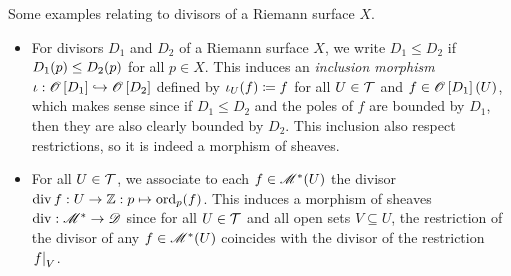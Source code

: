\documentclass[../Moduli_Spaces_of_Riemann_Surfaces.tex]{subfiles}
\begin{document}
    \begin{example}
        Some examples relating to divisors of a Riemann surface $X$.
        \begin{itemize}
            \item For divisors $D_1$ and $D_2$ of a Riemann surface $X$, we write $D_1\leq D_2$ if $D_1\!\left(p\right)\leq D_2\!\left(p\right)$ for all $p\in X$. This induces an \textit{inclusion morphism} $\iota:\mathscr{O}\left[D_1\right]\hookrightarrow\mathscr{O}\left[D_2\right]$ defined by $\iota_U\!\left(f\right)\coloneqq f$ for all $U\in\mathcal{T}$ and $f\in\mathscr{O}\left[D_1\right]\left(U\right)$, which makes sense since if $D_1\leq D_2$ and the poles of $f$ are bounded by $D_1$, then they are also clearly bounded by $D_2$. This inclusion also respect restrictions, so it is indeed a morphism of sheaves.
            \item For all $U\in\mathcal{T}$, we associate to each $f\in\mathscr{M}^\ast\!\left(U\right)$ the divisor $\operatorname{div} f:U\to\mathbb{Z}:p\mapsto\operatorname{ord}_p\!\left(f\right)$. This induces a morphism of sheaves $\operatorname{div}:\mathscr{M}^\ast\to\mathscr{D}$ since for all $U\in\mathcal{T}$ and all open sets $V\subseteq U$, the restriction of the divisor of any $f\in\mathscr{M}^\ast\!\left(U\right)$ coincides with the divisor of the restriction $\left.f\right|_V$.\exqed
        \end{itemize}
    \end{example}
\end{document}

